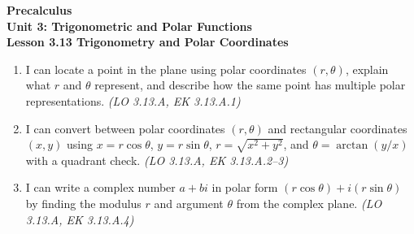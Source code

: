 \documentclass[10pt]{article}
\begin{document}
\vspace{-0.8in}

\begin{center}
  {\color{white}\textbf{\LARGE Precalculus}}\\[4pt]
  {\color{skymid}\large\textbf{Unit 3: Trigonometric and Polar Functions}}\\[6pt]
  {\color{white}\textbf{\large Lesson 3.13 \quad Trigonometry and Polar Coordinates}}
\end{center}

\vspace{0.22in}
\namedateperiod
\vspace{0.18in}

\begin{learningtargetbox}
\small
\begin{enumerate}[leftmargin=1.5em, itemsep=5pt]
  \item I can locate a point in the plane using polar coordinates $(r,\theta)$,
    explain what $r$ and $\theta$ represent, and describe how the same point has
    multiple polar representations. \hfill\textit{(LO 3.13.A, EK 3.13.A.1)}
  \item I can convert between polar coordinates $(r,\theta)$ and rectangular
    coordinates $(x,y)$ using $x = r\cos\theta$, $y = r\sin\theta$,
    $r = \sqrt{x^2+y^2}$, and $\theta = \arctan(y/x)$ with a quadrant check.
    \hfill\textit{(LO 3.13.A, EK 3.13.A.2--3)}
  \item I can write a complex number $a+bi$ in polar form $(r\cos\theta)+i(r\sin\theta)$
    by finding the modulus $r$ and argument $\theta$ from the complex plane.
    \hfill\textit{(LO 3.13.A, EK 3.13.A.4)}
\end{enumerate}
\end{learningtargetbox}

\vspace{0.14in}
\end{document}
